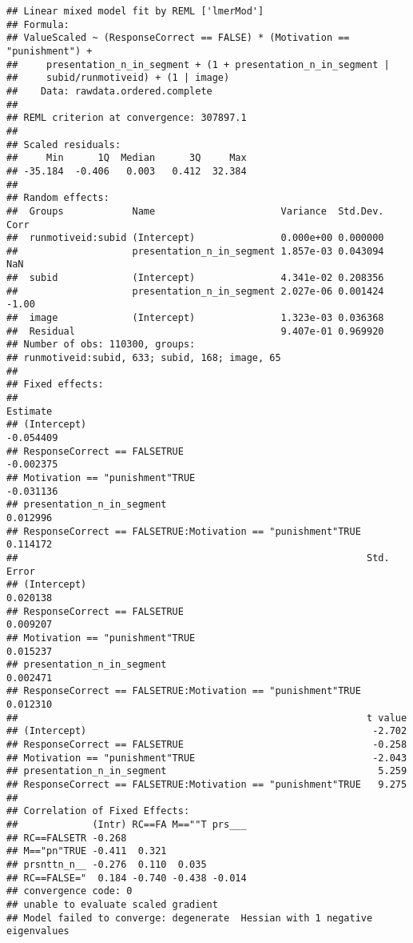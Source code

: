 \documentclass[]{article}
\begin{document}
\begin{verbatim}
## Linear mixed model fit by REML ['lmerMod']
## Formula: 
## ValueScaled ~ (ResponseCorrect == FALSE) * (Motivation == "punishment") +  
##     presentation_n_in_segment + (1 + presentation_n_in_segment |  
##     subid/runmotiveid) + (1 | image)
##    Data: rawdata.ordered.complete
## 
## REML criterion at convergence: 307897.1
## 
## Scaled residuals: 
##     Min      1Q  Median      3Q     Max 
## -35.184  -0.406   0.003   0.412  32.384 
## 
## Random effects:
##  Groups            Name                      Variance  Std.Dev. Corr 
##  runmotiveid:subid (Intercept)               0.000e+00 0.000000      
##                    presentation_n_in_segment 1.857e-03 0.043094  NaN 
##  subid             (Intercept)               4.341e-02 0.208356      
##                    presentation_n_in_segment 2.027e-06 0.001424 -1.00
##  image             (Intercept)               1.323e-03 0.036368      
##  Residual                                    9.407e-01 0.969920      
## Number of obs: 110300, groups:  
## runmotiveid:subid, 633; subid, 168; image, 65
## 
## Fixed effects:
##                                                              Estimate
## (Intercept)                                                 -0.054409
## ResponseCorrect == FALSETRUE                                -0.002375
## Motivation == "punishment"TRUE                              -0.031136
## presentation_n_in_segment                                    0.012996
## ResponseCorrect == FALSETRUE:Motivation == "punishment"TRUE  0.114172
##                                                             Std. Error
## (Intercept)                                                   0.020138
## ResponseCorrect == FALSETRUE                                  0.009207
## Motivation == "punishment"TRUE                                0.015237
## presentation_n_in_segment                                     0.002471
## ResponseCorrect == FALSETRUE:Motivation == "punishment"TRUE   0.012310
##                                                             t value
## (Intercept)                                                  -2.702
## ResponseCorrect == FALSETRUE                                 -0.258
## Motivation == "punishment"TRUE                               -2.043
## presentation_n_in_segment                                     5.259
## ResponseCorrect == FALSETRUE:Motivation == "punishment"TRUE   9.275
## 
## Correlation of Fixed Effects:
##             (Intr) RC==FA M==""T prs___
## RC==FALSETR -0.268                     
## M=="pn"TRUE -0.411  0.321              
## prsnttn_n__ -0.276  0.110  0.035       
## RC==FALSE="  0.184 -0.740 -0.438 -0.014
## convergence code: 0
## unable to evaluate scaled gradient
## Model failed to converge: degenerate  Hessian with 1 negative eigenvalues
\end{verbatim}
\end{document}
